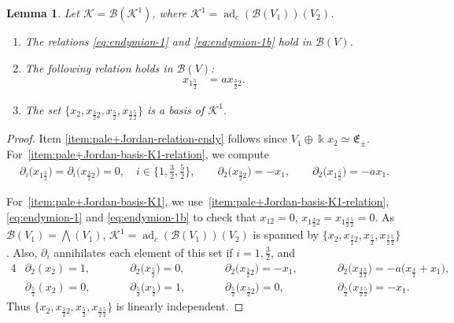 \documentclass[pdftex]{sigma}
\numberwithin{equation}{section}
\newtheorem{Lemma}[Theorem]{Lemma}
\newcommand{\adc}{\operatorname{ad}_c}
\newcommand{\toba}{\mathscr B}
\newcommand{\K}{{\mathcal{K}}}
\newcommand{\eny}{\mathfrak{E}}
\newcommand{\tresdos}{\frac{3}{2}}
\newcommand{\cincodos}{\frac{5}{2}}
\begin{document}
{\samepage\begin{Lemma}\label{lem:pale+Jordan-basis-K1}
Let $\K = \toba(\K^1)$, where $\K^1 = \adc(\toba(V_1))(V_2)$.
\begin{enumerate}[label=$(\alph*)$]\itemsep=0pt
\item\label{item:pale+Jordan-relation-endy} The relations
\eqref{eq:endymion-1} and \eqref{eq:endymion-1b}
hold in $\toba(V)$.
\item\label{item:pale+Jordan-basis-K1-relation} The following relation holds in $\toba(V)$:
\begin{align}\label{eq:pale+Jordan-def-rel-1}
x_{1\cincodos} &= a x_{\tresdos2}.
\end{align}
\item\label{item:pale+Jordan-basis-K1}
The set $\big\{x_{2}, x_{\tresdos2}, x_{\cincodos}, x_{\tresdos\cincodos}\big\}$ is a basis of $\K^1$.
\end{enumerate}
\end{Lemma}}

\begin{proof} Item \ref{item:pale+Jordan-relation-endy} follows since $V_1 \oplus \Bbbk x_2\simeq \eny_{\pm}$.
For~\ref{item:pale+Jordan-basis-K1-relation}, we compute
\begin{align*}
\partial_i\big(x_{1\cincodos}\big) = \partial_i\big(x_{\tresdos2}\big)=0, \quad
i \in\big\{1,\tfrac{3}{2}, \tfrac{5}{2}\big\},\qquad
\partial_2\big(x_{\tresdos2}\big) =-x_1,\qquad
\partial_2\big(x_{1\cincodos}\big) = -ax_1.
\end{align*}

For~\ref{item:pale+Jordan-basis-K1}, we use~\ref{item:pale+Jordan-basis-K1-relation}, \eqref{eq:endymion-1} and \eqref{eq:endymion-1b} to check that
$x_{12}= 0$, $x_{1\tresdos2} = x_{1\tresdos\cincodos}=0$. As $\toba(V_1) = \bigwedge(V_1)$, $\K^1 = \adc(\toba(V_1))(V_2)$ is spanned by
$\big\{x_{2}, x_{\tresdos2}, x_{\cincodos}, x_{\tresdos\cincodos} \big\}$. Also, $\partial_i$ annihilates each element of this set if $i=1,\tresdos$, and
\begin{alignat*}{4}
&\partial_2(x_{2}) = 1,\qquad && \partial_2\big(x_{\cincodos}\big) = 0, \qquad &&\partial_2\big(x_{\tresdos2}\big) = -x_1, \qquad &&\partial_2\big(x_{\tresdos\cincodos}\big) = -a\big(x_\tresdos+x_1\big),
\\
&\partial_\cincodos(x_{2}) = 0, && \partial_\cincodos\big(x_{\cincodos}\big) = 1, &&\partial_\cincodos\big(x_{\tresdos2}\big) = 0, &&\partial_\cincodos\big(x_{\tresdos\cincodos}\big) = -x_1.
\end{alignat*}
Thus $\big\{x_{2}, x_{\tresdos2}, x_{\cincodos}, x_{\tresdos\cincodos} \big\}$ is linearly independent.
\end{proof}
\end{document}

